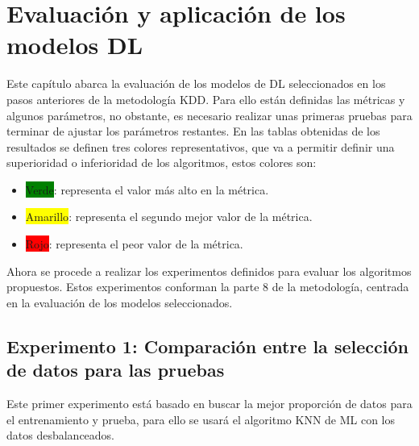 \chapter{Evaluaci\'{o}n y aplicaci\'{o}n de los modelos DL}

  Este cap\'{i}tulo abarca la evaluaci\'{o}n de los modelos de DL seleccionados en los pasos anteriores de la metodolog\'{i}a KDD. Para ello est\'{a}n definidas las m\'{e}tricas y algunos par\'{a}metros, no obstante, es necesario realizar unas primeras pruebas para terminar de ajustar los par\'{a}metros restantes. En las tablas obtenidas de los resultados se definen tres colores representativos, que va a permitir definir una superioridad o inferioridad de los algoritmos, estos colores son:
  \begin{itemize}
  	\item \colorbox{green}{Verde}: representa el valor m\'{a}s alto en la m\'{e}trica.
  	\item \colorbox{yellow}{Amarillo}: representa el segundo mejor valor de la m\'{e}trica.
  	\item \colorbox{red}{Rojo}: representa el peor valor de la m\'{e}trica.
  \end{itemize}

Ahora se procede a realizar los experimentos definidos para evaluar los algoritmos propuestos. Estos experimentos conforman la parte $8$ de la metodolog\'{i}a, centrada en la evaluaci\'{o}n de los modelos seleccionados.

\section{Experimento 1: Comparaci\'{o}n entre la selecci\'{o}n de datos para las pruebas}

Este primer experimento est\'{a} basado en buscar la mejor proporci\'{o}n de datos para el entrenamiento y prueba, para ello se usar\'{a} el algoritmo KNN de ML con los datos desbalanceados.

